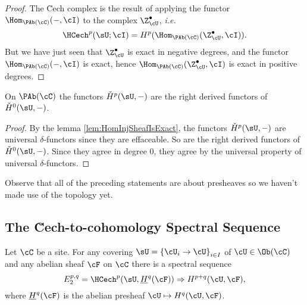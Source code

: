   \begin{proof}
  The \u Cech complex is the result of applying the functor $\Hom_{\PAb(\cC)}(-, \cI) $ to the complex $ \Z^\bullet_\cU $, {\it i.e.}
    $$
    \HCech^p(\sU ; \cI) = H^p (\Hom_{\PAb(\cC)} (\Z^\bullet_\cU, \cI)).
    $$
 But we have just seen that $\Z^\bullet_\cU$ is exact in negative degrees, and the functor $\Hom_{\PAb(\cC)}(-, \cI)$ is exact, hence $\Hom_{\PAb(\cC)} (\Z^\bullet_\cU, \cI)$ is exact in positive degrees.
  \end{proof}
  
  \begin{thm} 
  On $\PAb(\cC)$ the functors $\check{H}^p(\sU, -)$ are the right derived functors of $\check{H}^0(\sU, -)$.  
  \end{thm}
  
  \begin{proof}
 By the lemma \ref{lem:HomInjSheafIsExact}, the functors $\check H^p(\sU, -)$ are universal $\delta$-functors since they are effaceable.  So are the right derived functors of $\check H^0(\sU, -)$.  Since they agree in degree $0$, they agree by the universal property of universal $\delta$-functors.
  \end{proof}

\begin{remark}
Observe that all of the preceding statements are about presheaves so we haven't made use of the topology yet. 
\end{remark}

\subsection{The \u Cech-to-cohomology Spectral Sequence}

\begin{thm} \label{thm:SpectralSequenceCechToCohom}
Let $\cC$ be a site. For any covering $\sU= \left\{\cU_i\to \cU\right\}_{i\in I}$ of  $\cU\in \Ob(\cC)$ and any abelian sheaf $\cF$ on $\cC$ there is a spectral sequence 
  $$
 E_2^{p, q}
  =
 \HCech^p(\sU,\underline{H}^q(\cF)) \Rightarrow H^{p+q}(\cU, \cF),
$$
    where $\underline{H}^q(\cF)$ is the abelian presheaf  $\cU\mapsto H^q(\cU, \cF)$.  
  \end{thm}
  
